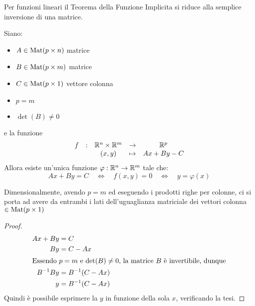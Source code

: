 \vspace*{\baselineskip}
Per funzioni lineari il Teorema della Funzione Implicita si riduce alla semplice inversione di una matrice.
\begin{theorem}
	\label{teo:funz_impl_lin}
	Siano:
	\begin{itemize}[noitemsep]
		\item $A \in \operatorname{Mat}(p \times n)$ matrice
		\item $B \in \operatorname{Mat}(p \times m)$ matrice
		\item $C \in \operatorname{Mat}(p \times 1)$ vettore colonna
		\item $p = m$
		\item $\det(B) \neq 0$
	\end{itemize}
	e la funzione
	\[\begin{array}{ccccc} {f} & : & {\mathbb{R}^n \times \mathbb{R}^m} & \to & {\mathbb{R}^p} \\ & & {(x, y)} & \mapsto & {Ax + By - C} \\ \end{array}\]
	Allora esiste un'unica funzione $\varphi: \mathbb{R}^n \to \mathbb{R}^m$ tale che:
	\[Ax + By = C \quad \iff \quad f(x,y) = 0 \quad \iff \quad y = \varphi(x)\]
	\vspace*{-5ex}
	\begin{note}
		Dimensionalmente, avendo $p = m$ ed eseguendo i prodotti righe per colonne, ci si porta ad avere da entrambi i lati dell'uguaglianza matriciale dei vettori colonna $\in \operatorname{Mat}(p \times 1)$
	\end{note}
	\begin{proof}
		\begin{align*}
			Ax + By &= C\\
			By &= C - Ax\\
			\shortintertext{Essendo $p = m$ e $\det(B) \neq 0$, la matrice $B$ è invertibile, dunque}
			B^{-1} By &= B^{-1} (C - Ax)\\
			y &= B^{-1} (C - Ax)
		\end{align*}
		Quindi è possibile esprimere la $y$ in funzione della sola $x$, verificando la tesi.
	\end{proof}
\end{theorem}

